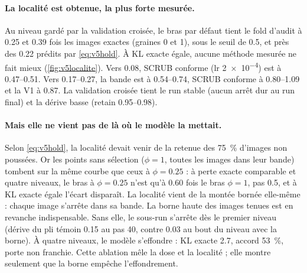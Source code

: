 \documentclass[11pt,a4paper]{article}
\begin{document}
\paragraph{La localité est obtenue, la plus forte mesurée.} Au niveau gardé par la validation croisée,
le bras par défaut tient le fold d'audit à \num{0.25} et \num{0.39} fois les images exactes (graines 0
et 1), sous le seuil de \num{0.5}, et près des \num{0.22} prédits par \cref{eq:v5hold}. À KL exacte
égale, aucune méthode mesurée ne fait mieux (\cref{fig:v5localite}). Vers \num{0.08}, SCRUB conforme
(lr \num{2e-4}) est à \numrange{0.47}{0.51}. Vers \numrange{0.17}{0.27}, la bande est à
\numrange{0.54}{0.74}, SCRUB conforme à \numrange{0.80}{1.09} et la V1 à \num{0.87}. La validation croisée
tient le run stable (aucun arrêt dur au run final) et la dérive basse (retain \numrange{0.95}{0.98}).

\paragraph{Mais elle ne vient pas de là où le modèle la mettait.} Selon \cref{eq:v5hold}, la localité
devait venir de la retenue des \SI{75}{\percent} d'images non poussées. Or les points sans sélection
($\phi=1$, toutes les images dans leur bande) tombent sur la même courbe que ceux à $\phi=\num{0.25}$ :
à perte exacte comparable et quatre niveaux, le bras à $\phi=\num{0.25}$ n'est qu'à \num{0.60} fois
le bras $\phi=1$, pas \num{0.5}, et à KL exacte égale l'écart disparaît. La localité vient de la montée bornée
elle-même : chaque image s'arrête dans sa bande. La borne haute des images tenues est en revanche
indispensable. Sans elle, le sous-run s'arrête dès le premier niveau (dérive du pli témoin \num{0.15}
au pas 40, contre \num{0.03} au bout du niveau avec la borne). À quatre niveaux, le modèle s'effondre :
KL exacte \num{2.7}, accord \SI{53}{\percent}, porte non franchie. Cette ablation mêle la dose et la
localité ; elle montre seulement que la borne empêche l'effondrement.
\end{document}
